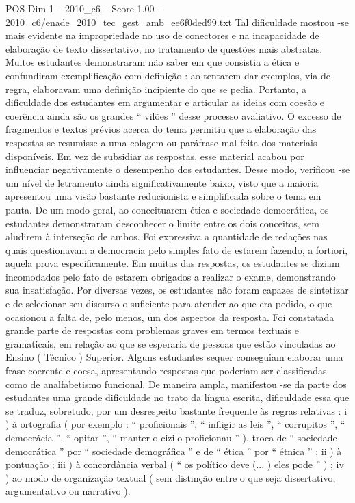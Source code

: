 \begin{textsample}{POS Dim 1 – 2010\_c6 – Score 1.00 – 2010\_c6/enade\_2010\_tec\_gest\_amb\_ee6f0ded99.txt}
Tal dificuldade mostrou -se mais evidente na impropriedade no uso de conectores e na incapacidade de elaboração de texto dissertativo, no tratamento de questões mais abstratas.
Muitos estudantes demonstraram não saber em que consistia a ética e confundiram exemplificação com definição : ao tentarem dar exemplos, via de regra, elaboravam uma definição incipiente do que se pedia.
Portanto, a dificuldade dos estudantes em argumentar e articular as ideias com coesão e coerência ainda são os grandes “ vilões ” desse processo avaliativo.
O excesso de fragmentos e textos prévios acerca do tema permitiu que a elaboração das respostas se resumisse a uma colagem ou paráfrase mal feita dos materiais disponíveis.
Em vez de subsidiar as respostas, esse material acabou por influenciar negativamente o desempenho dos estudantes.
Desse modo, verificou -se um nível de letramento ainda significativamente baixo, visto que a maioria apresentou uma visão bastante reducionista e simplificada sobre o tema em pauta.
De um modo geral, ao conceituarem ética e sociedade democrática, os estudantes demonstraram desconhecer o limite entre os dois conceitos, sem aludirem à interseção de ambos.
Foi expressiva a quantidade de redações nas quais questionavam a democracia pelo simples fato de estarem fazendo, a fortiori, aquela prova especificamente.
Em muitas das respostas, os estudantes se diziam incomodados pelo fato de estarem obrigados a realizar o exame, demonstrando sua insatisfação.
Por diversas vezes, os estudantes não foram capazes de sintetizar e de selecionar seu discurso o suficiente para atender ao que era pedido, o que ocasionou a falta de, pelo menos, um dos aspectos da resposta.
Foi constatada grande parte de respostas com problemas graves em termos textuais e gramaticais, em relação ao que se esperaria de pessoas que estão vinculadas ao Ensino ( Técnico ) Superior.
Alguns estudantes sequer conseguiam elaborar uma frase coerente e coesa, apresentando respostas que poderiam ser classificadas como de analfabetismo funcional.
De maneira ampla, manifestou -se da parte dos estudantes uma grande dificuldade no trato da língua escrita, dificuldade essa que se traduz, sobretudo, por um desrespeito bastante frequente às regras relativas : i ) à ortografia ( por exemplo : “ proficionais ”, “ infligir as leis ”, “ corrupitos ”, “ democrácia ”, “ opitar ”, “ manter o cizilo proficionau ” ), troca de “ sociedade democrática ” por “ sociedade demográfica ” e de “ ética ” por “ étnica ” ; ii ) à pontuação ; iii ) à concordância verbal ( “ os político deve (... ) eles pode ” ) ; iv ) ao modo de organização textual ( sem distinção entre o que seja dissertativo, argumentativo ou narrativo ).

\end{textsample}
